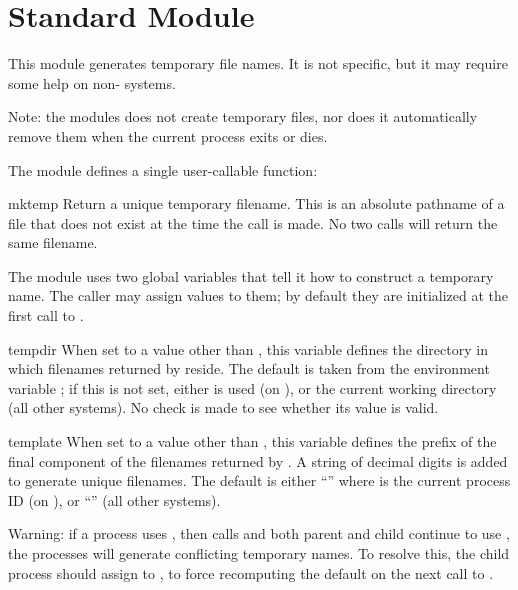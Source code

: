 \section{Standard Module }

\renewcommand{\indexsubitem}{(in module tempfile)}

This module generates temporary file names.  It is not \UNIX{} specific,
but it may require some help on non-\UNIX{} systems.

Note: the modules does not create temporary files, nor does it
automatically remove them when the current process exits or dies.

The module defines a single user-callable function:

\begin{funcdesc}{mktemp}{}
Return a unique temporary filename.  This is an absolute pathname of a
file that does not exist at the time the call is made.  No two calls
will return the same filename.
\end{funcdesc}

The module uses two global variables that tell it how to construct a
temporary name.  The caller may assign values to them; by default they
are initialized at the first call to .

\begin{datadesc}{tempdir}
When set to a value other than , this variable defines the
directory in which filenames returned by  reside.  The
default is taken from the environment variable ; if this
is not set, either  is used (on \UNIX{}), or the current
working directory (all other systems).  No check is made to see
whether its value is valid.
\end{datadesc}

\begin{datadesc}{template}
When set to a value other than , this variable defines the
prefix of the final component of the filenames returned by
.  A string of decimal digits is added to generate
unique filenames.  The default is either ``'' where
 is the current process ID (on \UNIX{}), or ``'' (all
other systems).
\end{datadesc}

Warning: if a \UNIX{} process uses , then calls
 and both parent and child continue to use
, the processes will generate conflicting temporary
names.  To resolve this, the child process should assign 
to , to force recomputing the default on the next call
to .
